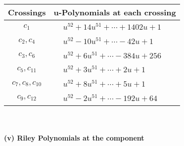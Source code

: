 \documentclass[1p]{elsarticle_modified}
\theoremstyle{definition}
\begin{document}
\begin{tabular}{m{50pt}|m{274pt}}
Crossings & \hspace{64pt}u-Polynomials at each crossing \\
\hline $$\begin{aligned}c_{1}\end{aligned}$$&$\begin{aligned}
&u^{52}+14 u^{51}+\cdots+1402 u+1
\end{aligned}$\\
\hline $$\begin{aligned}c_{2},c_{4}\end{aligned}$$&$\begin{aligned}
&u^{52}-10 u^{51}+\cdots-42 u+1
\end{aligned}$\\
\hline $$\begin{aligned}c_{3},c_{6}\end{aligned}$$&$\begin{aligned}
&u^{52}+6 u^{51}+\cdots-384 u+256
\end{aligned}$\\
\hline $$\begin{aligned}c_{5},c_{11}\end{aligned}$$&$\begin{aligned}
&u^{52}+3 u^{51}+\cdots+2 u+1
\end{aligned}$\\
\hline $$\begin{aligned}c_{7},c_{8},c_{10}\end{aligned}$$&$\begin{aligned}
&u^{52}+8 u^{51}+\cdots+5 u+1
\end{aligned}$\\
\hline $$\begin{aligned}c_{9},c_{12}\end{aligned}$$&$\begin{aligned}
&u^{52}-2 u^{51}+\cdots-192 u+64
\end{aligned}$\\
\hline
\end{tabular}\\~\\
\newpage\renewcommand{\arraystretch}{1}
\flushleft \textbf{(v) Riley Polynomials at the component}\newline \\
\end{document}
